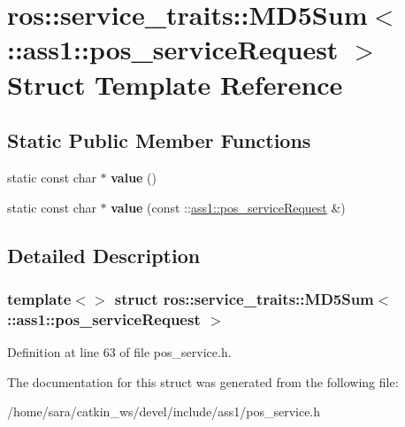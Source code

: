 \hypertarget{structros_1_1service__traits_1_1MD5Sum_3_01_1_1ass1_1_1pos__serviceRequest_01_4}{}\section{ros\+:\+:service\+\_\+traits\+:\+:M\+D5\+Sum$<$ \+:\+:ass1\+:\+:pos\+\_\+service\+Request $>$ Struct Template Reference}
\label{structros_1_1service__traits_1_1MD5Sum_3_01_1_1ass1_1_1pos__serviceRequest_01_4}
\subsection*{Static Public Member Functions}
\begin{DoxyCompactItemize}
\item 
\mbox{\label{structros_1_1service__traits_1_1MD5Sum_3_01_1_1ass1_1_1pos__serviceRequest_01_4_a06172c32df1dd63be35128b44c39b797}} 
static const char $\ast$ {\bfseries value} ()
\item 
\mbox{\label{structros_1_1service__traits_1_1MD5Sum_3_01_1_1ass1_1_1pos__serviceRequest_01_4_a1d43c035126bafaef0e046ccc5344c52}} 
static const char $\ast$ {\bfseries value} (const \+::\hyperlink{structass1_1_1pos__serviceRequest__}{ass1\+::pos\+\_\+service\+Request} \&)
\end{DoxyCompactItemize}


\subsection{Detailed Description}
\subsubsection*{template$<$$>$\newline
struct ros\+::service\+\_\+traits\+::\+M\+D5\+Sum$<$ \+::ass1\+::pos\+\_\+service\+Request $>$}



Definition at line 63 of file pos\+\_\+service.\+h.



The documentation for this struct was generated from the following file\+:\begin{DoxyCompactItemize}
\item 
/home/sara/catkin\+\_\+ws/devel/include/ass1/pos\+\_\+service.\+h\end{DoxyCompactItemize}
